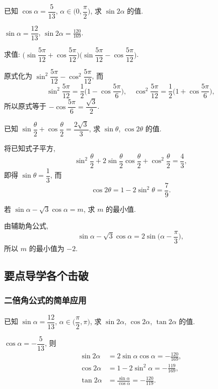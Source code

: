 \begin{exercise}
    已知 $\cos \alpha= \dfrac5{13}$, $\alpha\in\Big(0,\dfrac\pi2\Big)$, 求 $\sin 2\alpha$ 的值.
\end{exercise}
\beginsolution
    $\sin\alpha= \dfrac{12}{13}$, $\sin2\alpha= \frac{120}{169}$.
\endsolution

\begin{exercise}
    求值: $\Big(\sin\dfrac{5\pi}{12}+ \cos\dfrac{5\pi}{12}\Big)
        \Big(\sin\dfrac{5\pi}{12}- \cos\dfrac{5\pi}{12}\Big)$.
\end{exercise}
\beginsolution
    原式化为 $\sin^2\dfrac{5\pi}{12}- \cos^2\dfrac{5\pi}{12}$, 而
    \[\sin^2\dfrac{5\pi}{12}
        = \frac12\biggl(1-\cos\frac{5\pi}{6}\biggr),\quad
    \cos^2\dfrac{5\pi}{12}
        = \frac12\biggl(1+\cos\frac{5\pi}{6}\biggr),\]
    所以原式等于 $-\cos\dfrac{5\pi}6= \dfrac{\sqrt3}2$.
\endsolution

\begin{exercise}
    已知 $\sin\dfrac\theta2+ \cos\dfrac\theta2= \dfrac{2\sqrt3}3$, 求 $\sin \theta$, $\cos 2\theta$ 的值.
\end{exercise}
\beginsolution
    将已知式子平方,
    \[\sin^2\frac\theta2+ 2\sin\frac\theta2\cos\frac\theta2
        + \cos^2\frac\theta2= \frac43,\]
    即得 $\sin\theta= \dfrac13$, 而
    \[\cos2\theta= 1-2\sin^2\theta= \frac79.\]
\endsolution

\begin{exercise}
    若 $\sin\alpha- \sqrt3 \cos\alpha=m$, 求 $m$ 的最小值.
\end{exercise}
\beginsolution
    由辅助角公式, 
    \[\sin\alpha- \sqrt3 \cos\alpha=2\sin\biggl(\alpha- \dfrac\pi3\biggr),\]
    所以 $m$ 的最小值为 $-2$.
\endsolution

\subsection{要点导学\quad 各个击破}
\subsubsection{二倍角公式的简单应用}
\begin{example}
    已知 $\sin \alpha= \dfrac{12}{13}$, $\alpha\in\Big(\dfrac\pi2,\pi\Big)$, 求 $\sin 2\alpha$, $\cos 2\alpha$, $\tan 2\alpha$ 的值.
\end{example}
\beginsolution
    $\cos\alpha= -\dfrac5{13}$, 则
    \[\begin{aligned}
        \sin2\alpha&= 2\sin\alpha\cos\alpha= -\frac{120}{169},\\
        \cos2\alpha&= 1- 2\sin^2\alpha= -\frac{119}{169},\\
        \tan2\alpha&= \frac{\sin\alpha}{\cos\alpha}
            = -\frac{120}{119}.
    \end{aligned}\]
\endsolution

